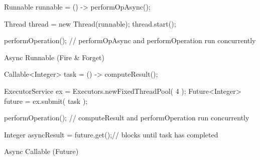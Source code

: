 \begin{center}
\begin{minipage}{0.42\textwidth}
\begin{sourcecode}
\begin{javacode}{}
Runnable runnable = () -> performOpAsync();

Thread thread = new Thread(runnable);
thread.start();

performOperation();
// performOpAsync and performOperation run concurrently
\end{javacode}
\caption{Async Runnable (Fire \& Forget)}
\label{code:asyncRunnableExample}
\end{sourcecode}
\end{minipage}\hspace{0.6cm}
\begin{minipage}{0.53\textwidth}
\begin{sourcecode}
\begin{javacode}{}
Callable<Integer> task = () -> computeResult();

ExecutorService ex = Executors.newFixedThreadPool( 4 );
Future<Integer> future = ex.submit( task );

performOperation();
// computeResult and performOperation run concurrently

Integer asyncResult = future.get();// blocks until task has completed
\end{javacode}
\caption{Async Callable (Future)}
\label{code:asyncFutureExample}
\end{sourcecode}
\end{minipage}
\end{center}